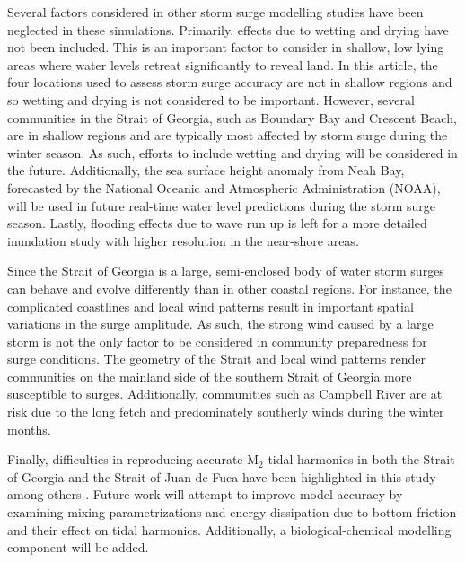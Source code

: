 \documentclass[pdftex,10pt]{article}
\begin{document}
Several factors considered in other storm surge modelling studies have been neglected in these simulations. Primarily, effects due to wetting and drying have not been included. This is an important factor to consider in shallow, low lying areas where water levels retreat significantly to reveal land. In this article, the four locations used to assess storm surge accuracy are not in shallow regions and so wetting and drying is not considered to be important. However, several communities in the Strait of Georgia, such as Boundary Bay and Crescent Beach, are in shallow regions and are typically most affected by storm surge during the winter season. As such, efforts to include wetting and drying will be considered in the future. Additionally, the sea surface height anomaly from Neah Bay, forecasted by the National Oceanic and Atmospheric Administration (NOAA), will be used in future real-time water level predictions during the storm surge season. Lastly, flooding effects due to wave run up is left for a more detailed inundation study with higher resolution in the near-shore areas. 

Since the Strait of Georgia is a large, semi-enclosed body of water storm surges can behave and evolve differently than in other coastal regions. For instance, the complicated coastlines and local wind patterns result in important spatial variations in the surge amplitude. As such, the strong wind caused by a large storm is not the only factor to be considered in community preparedness for surge conditions. The geometry of the Strait and local wind patterns render communities on the mainland side of the southern Strait of Georgia more susceptible to surges. Additionally, communities such as Campbell River are at risk due to the long fetch and predominately southerly winds during the winter months.

Finally, difficulties in reproducing accurate M$_2$ tidal harmonics in both the Strait of Georgia and the Strait of Juan de Fuca have been highlighted in this study among others \citep{stronach1993update, foreman2004m}. Future work will attempt to improve model accuracy by examining mixing parametrizations and energy dissipation due to bottom friction and their effect on tidal harmonics. Additionally, a biological-chemical modelling component will be added. 



\appendix
\end{document}

